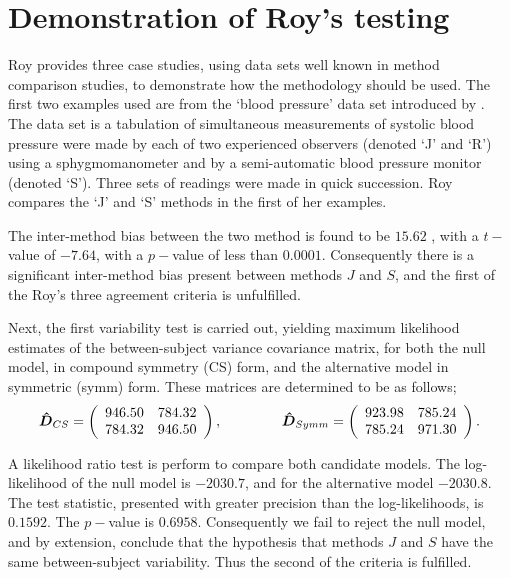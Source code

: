 \documentclass[12pt, a4paper]{report}
\theoremstyle{plain}
\theoremstyle{definition}
\theoremstyle{remark}
\begin{document}
	\section{Demonstration of Roy's testing}
	Roy provides three case studies, using data sets well known in method comparison studies, to demonstrate how the methodology should be used. The first two examples used are from the `blood pressure' data set introduced by \citet{BA99}. The data set is a tabulation of simultaneous measurements of systolic blood pressure were made by each of two experienced observers (denoted `J' and `R') using a sphygmomanometer and by a semi-automatic blood pressure monitor (denoted `S'). Three sets of readings were made in quick succession. Roy compares the `J' and `S' methods in the first of her examples.
	
	The inter-method bias between the two method is found to be $15.62$ , with a $t-$value of $-7.64$, with a $p-$value of less than $0.0001$. Consequently there is a significant inter-method bias present between methods $J$ and $S$, and the first of the Roy's three agreement criteria is unfulfilled.
	
	Next, the first variability test is carried out, yielding maximum likelihood estimates of the between-subject variance covariance matrix, for both the null model, in compound symmetry (CS) form, and the alternative model in symmetric (symm) form. These matrices are determined to be as follows;
	\[
	\boldsymbol{\hat{D}}_{CS} = \left( \begin{array}{cc}
	946.50 & 784.32  \\
	784.32 & 946.50  \\
	\end{array}\right),
	\hspace{1.5cm}
	\boldsymbol{\hat{D}}_{Symm} = \left( \begin{array}{cc}
	923.98 & 785.24  \\
	785.24 & 971.30  \\
	\end{array}\right).
	\]
	
	A likelihood ratio test is perform to compare both candidate models. The log-likelihood of the null model is $-2030.7$, and for the alternative model $-2030.8$. The test statistic, presented with greater precision than the log-likelihoods, is $0.1592$. The $p-$value is $0.6958$. Consequently we fail to reject the null model, and by extension, conclude that the hypothesis that methods $J$ and $S$ have the same between-subject variability. Thus the second of the criteria is fulfilled.
	
\end{document}
